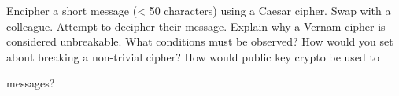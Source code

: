 \begin{questions}

	\question Encipher a short message (< 50 characters) using a Caesar cipher. Swap with a colleague. Attempt to decipher their message. 
	\question Explain why a Vernam cipher is considered unbreakable. What conditions must be observed? 
	\question How would you set about breaking a non-trivial cipher? 
	\question How would public key crypto be used to 
	messages? 
\end{questions}